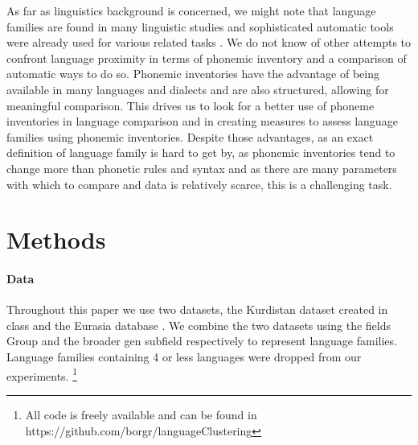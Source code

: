 \documentclass[letterpaper, 11pt]{article}
\begin{document}
As far as linguistics background is concerned, we might note that language families are found in many linguistic studies \cite{aikhenvald1999arawak} and sophisticated automatic tools were already used for various related tasks \cite{bouckaert2012mapping}. We do not know of other attempts to confront language proximity in terms of phonemic inventory and a comparison of automatic ways to do so. 
Phonemic inventories have the advantage of being available in many languages and dialects and are also structured, allowing for meaningful comparison. This drives us to look for a better use of phoneme inventories in language comparison and in creating measures to assess language families using phonemic inventories. Despite those advantages, as an exact definition of language family is hard to get by, as phonemic inventories tend to change more than phonetic rules and syntax \cite{mohammadi2comparative} and as there are many parameters with which to compare and data is relatively scarce, this is a challenging task.
\section{Methods}
\paragraph{Data} Throughout this paper we use two datasets, the Kurdistan dataset created in class and the Eurasia database \cite{Nikolaev2015database}. We combine the two datasets using the fields Group and the broader gen subfield respectively to represent language families. Language families containing 4 or less languages were dropped from our experiments.
\footnote{All code is freely available and can be found in https://github.com/borgr/languageClustering}
\end{document}

